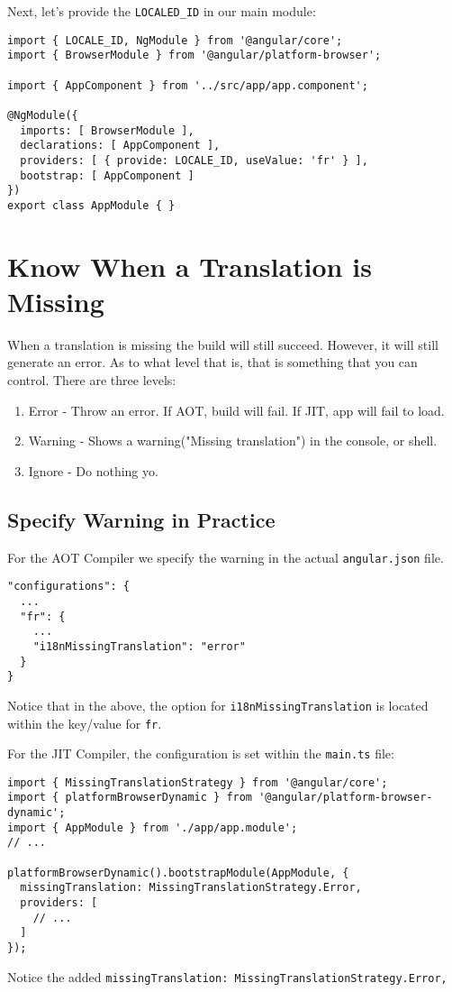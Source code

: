 Next, let's provide the \lstinline{LOCALED_ID} in our main module: 
\begin{lstlisting}[caption=app.module.ts]
import { LOCALE_ID, NgModule } from '@angular/core';
import { BrowserModule } from '@angular/platform-browser';

import { AppComponent } from '../src/app/app.component';

@NgModule({
  imports: [ BrowserModule ],
  declarations: [ AppComponent ],
  providers: [ { provide: LOCALE_ID, useValue: 'fr' } ],
  bootstrap: [ AppComponent ]
})
export class AppModule { }  
\end{lstlisting}

\section{Know When a Translation is Missing}
When a translation is missing the build will still succeed. However, it will 
still generate an error. As to what level that is, that is something that you 
can control. There are three levels: 
\begin{enumerate}
  \item Error - Throw an error. If AOT, build will fail. If JIT, app will fail 
  to load. 
  \item Warning - Shows a warning("Missing translation") in the console, or 
  shell.
  \item Ignore - Do nothing yo. 
\end{enumerate}

\subsection{Specify Warning in Practice}
For the AOT Compiler we specify the warning in the actual
\lstinline{angular.json} file. 
\begin{lstlisting}[caption=angular.json]
"configurations": {
  ...
  "fr": {
    ...
    "i18nMissingTranslation": "error"
  }
}  
\end{lstlisting}

Notice that in the above, the option for \lstinline{i18nMissingTranslation} is
located within the key/value for \lstinline{fr}.

For the JIT Compiler, the configuration is set within the \lstinline{main.ts}
file: 
\begin{lstlisting}[caption=src/main.ts]
import { MissingTranslationStrategy } from '@angular/core';
import { platformBrowserDynamic } from '@angular/platform-browser-dynamic';
import { AppModule } from './app/app.module';
// ...

platformBrowserDynamic().bootstrapModule(AppModule, {
  missingTranslation: MissingTranslationStrategy.Error,
  providers: [
    // ...
  ]
});
\end{lstlisting}
Notice the added \lstinline{missingTranslation: MissingTranslationStrategy.Error,}

